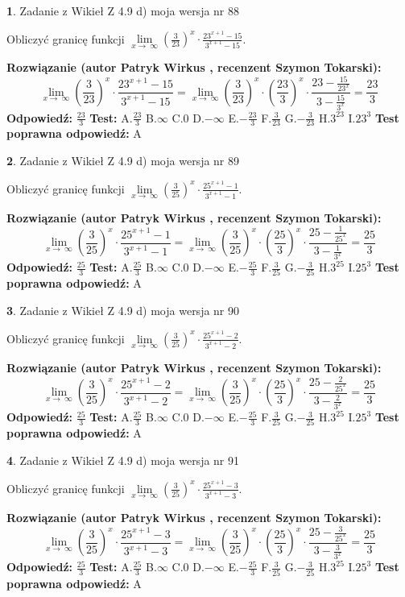\documentclass[12pt, a4paper]{article}
\theoremstyle{definition} %
\newtheorem{zad}{}
\newcommand{\zadStart}[1]{\begin{zad}#1\newline}
\newcommand{\zadStop}{\end{zad}}
\newcommand{\rozwStart}[2]{\noindent \textbf{Rozwiązanie (autor #1 , recenzent #2): }\newline}
\newcommand{\rozwStop}{\newline}
\newcommand{\odpStart}{\noindent \textbf{Odpowiedź:}\newline}
\newcommand{\odpStop}{\newline}
\newcommand{\testStart}{\noindent \textbf{Test:}\newline}
\newcommand{\testStop}{\newline}
\newcommand{\kluczStart}{\noindent \textbf{Test poprawna odpowiedź:}\newline}
\newcommand{\kluczStop}{\newline}
\begin{document}
\zadStart{Zadanie z Wikieł Z 4.9 d) moja wersja nr 88}


Obliczyć granicę funkcji  $\lim\limits_{x\to\ \infty}(\frac{3}{23})^{x}\cdot\frac{23^{x+1}-15}{3^{x+1}-15}$.
\zadStop
\rozwStart{Patryk Wirkus}{Szymon Tokarski}
$$\lim\limits_{x\to\ \infty}(\frac{3}{23})^{x}\cdot\frac{23^{x+1}-15}{3^{x+1}-15}=\lim\limits_{x\to\ \infty}(\frac{3}{23})^{x}\cdot(\frac{23}{3})^{x} \cdot \frac{23-\frac{15}{23^{x}}}{3-\frac{15}{3^{x}}} = \frac{23}{3}$$
\rozwStop
\odpStart
$\frac{23}{3}$
\odpStop
\testStart
A.$\frac{23}{3}$ B.$\infty$ C.$0$ D.$-\infty$ E.$-\frac{23}{3}$
F.$\frac{3}{23}$ G.$-\frac{3}{23}$
H.$3^{23}$
I.$23^{3}$
\testStop
\kluczStart
A
\kluczStop



\zadStart{Zadanie z Wikieł Z 4.9 d) moja wersja nr 89}


Obliczyć granicę funkcji  $\lim\limits_{x\to\ \infty}(\frac{3}{25})^{x}\cdot\frac{25^{x+1}-1}{3^{x+1}-1}$.
\zadStop
\rozwStart{Patryk Wirkus}{Szymon Tokarski}
$$\lim\limits_{x\to\ \infty}(\frac{3}{25})^{x}\cdot\frac{25^{x+1}-1}{3^{x+1}-1}=\lim\limits_{x\to\ \infty}(\frac{3}{25})^{x}\cdot(\frac{25}{3})^{x} \cdot \frac{25-\frac{1}{25^{x}}}{3-\frac{1}{3^{x}}} = \frac{25}{3}$$
\rozwStop
\odpStart
$\frac{25}{3}$
\odpStop
\testStart
A.$\frac{25}{3}$ B.$\infty$ C.$0$ D.$-\infty$ E.$-\frac{25}{3}$
F.$\frac{3}{25}$ G.$-\frac{3}{25}$
H.$3^{25}$
I.$25^{3}$
\testStop
\kluczStart
A
\kluczStop



\zadStart{Zadanie z Wikieł Z 4.9 d) moja wersja nr 90}


Obliczyć granicę funkcji  $\lim\limits_{x\to\ \infty}(\frac{3}{25})^{x}\cdot\frac{25^{x+1}-2}{3^{x+1}-2}$.
\zadStop
\rozwStart{Patryk Wirkus}{Szymon Tokarski}
$$\lim\limits_{x\to\ \infty}(\frac{3}{25})^{x}\cdot\frac{25^{x+1}-2}{3^{x+1}-2}=\lim\limits_{x\to\ \infty}(\frac{3}{25})^{x}\cdot(\frac{25}{3})^{x} \cdot \frac{25-\frac{2}{25^{x}}}{3-\frac{2}{3^{x}}} = \frac{25}{3}$$
\rozwStop
\odpStart
$\frac{25}{3}$
\odpStop
\testStart
A.$\frac{25}{3}$ B.$\infty$ C.$0$ D.$-\infty$ E.$-\frac{25}{3}$
F.$\frac{3}{25}$ G.$-\frac{3}{25}$
H.$3^{25}$
I.$25^{3}$
\testStop
\kluczStart
A
\kluczStop



\zadStart{Zadanie z Wikieł Z 4.9 d) moja wersja nr 91}


Obliczyć granicę funkcji  $\lim\limits_{x\to\ \infty}(\frac{3}{25})^{x}\cdot\frac{25^{x+1}-3}{3^{x+1}-3}$.
\zadStop
\rozwStart{Patryk Wirkus}{Szymon Tokarski}
$$\lim\limits_{x\to\ \infty}(\frac{3}{25})^{x}\cdot\frac{25^{x+1}-3}{3^{x+1}-3}=\lim\limits_{x\to\ \infty}(\frac{3}{25})^{x}\cdot(\frac{25}{3})^{x} \cdot \frac{25-\frac{3}{25^{x}}}{3-\frac{3}{3^{x}}} = \frac{25}{3}$$
\rozwStop
\odpStart
$\frac{25}{3}$
\odpStop
\testStart
A.$\frac{25}{3}$ B.$\infty$ C.$0$ D.$-\infty$ E.$-\frac{25}{3}$
F.$\frac{3}{25}$ G.$-\frac{3}{25}$
H.$3^{25}$
I.$25^{3}$
\testStop
\kluczStart
A
\kluczStop
\end{document}
